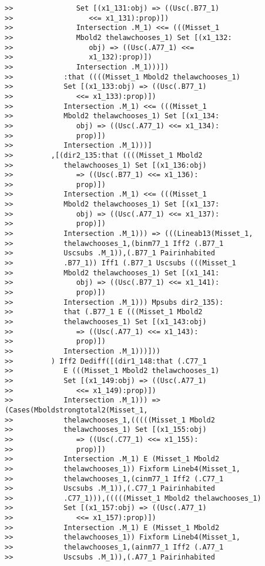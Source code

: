 \documentclass[12pt]{article}
\begin{document}
\begin{verbatim}
>>               Set [(x1_131:obj) => ((Usc(.B77_1)
>>                  <<= x1_131):prop)])
>>               Intersection .M_1) <<= (((Misset_1
>>               Mbold2 thelawchooses_1) Set [(x1_132:
>>                  obj) => ((Usc(.A77_1) <<=
>>                  x1_132):prop)])
>>               Intersection .M_1)))])
>>            :that ((((Misset_1 Mbold2 thelawchooses_1)
>>            Set [(x1_133:obj) => ((Usc(.B77_1)
>>               <<= x1_133):prop)])
>>            Intersection .M_1) <<= (((Misset_1
>>            Mbold2 thelawchooses_1) Set [(x1_134:
>>               obj) => ((Usc(.A77_1) <<= x1_134):
>>               prop)])
>>            Intersection .M_1)))]
>>         ,[(dir2_135:that ((((Misset_1 Mbold2
>>            thelawchooses_1) Set [(x1_136:obj)
>>               => ((Usc(.B77_1) <<= x1_136):
>>               prop)])
>>            Intersection .M_1) <<= (((Misset_1
>>            Mbold2 thelawchooses_1) Set [(x1_137:
>>               obj) => ((Usc(.A77_1) <<= x1_137):
>>               prop)])
>>            Intersection .M_1))) => (((Lineab13(Misset_1,
>>            thelawchooses_1,(binm77_1 Iff2 (.B77_1
>>            Uscsubs .M_1)),(.B77_1 Pairinhabited
>>            .B77_1)) Iff1 (.B77_1 Uscsubs (((Misset_1
>>            Mbold2 thelawchooses_1) Set [(x1_141:
>>               obj) => ((Usc(.B77_1) <<= x1_141):
>>               prop)])
>>            Intersection .M_1))) Mpsubs dir2_135):
>>            that (.B77_1 E (((Misset_1 Mbold2
>>            thelawchooses_1) Set [(x1_143:obj)
>>               => ((Usc(.A77_1) <<= x1_143):
>>               prop)])
>>            Intersection .M_1)))]))
>>         ) Iff2 Dediff([(dir1_148:that (.C77_1
>>            E (((Misset_1 Mbold2 thelawchooses_1)
>>            Set [(x1_149:obj) => ((Usc(.A77_1)
>>               <<= x1_149):prop)])
>>            Intersection .M_1))) => (Cases(Mboldstrongtotal2(Misset_1,
>>            thelawchooses_1,(((((Misset_1 Mbold2
>>            thelawchooses_1) Set [(x1_155:obj)
>>               => ((Usc(.C77_1) <<= x1_155):
>>               prop)])
>>            Intersection .M_1) E (Misset_1 Mbold2
>>            thelawchooses_1)) Fixform Lineb4(Misset_1,
>>            thelawchooses_1,(cinm77_1 Iff2 (.C77_1
>>            Uscsubs .M_1)),(.C77_1 Pairinhabited
>>            .C77_1))),(((((Misset_1 Mbold2 thelawchooses_1)
>>            Set [(x1_157:obj) => ((Usc(.A77_1)
>>               <<= x1_157):prop)])
>>            Intersection .M_1) E (Misset_1 Mbold2
>>            thelawchooses_1)) Fixform Lineb4(Misset_1,
>>            thelawchooses_1,(ainm77_1 Iff2 (.A77_1
>>            Uscsubs .M_1)),(.A77_1 Pairinhabited

\end{verbatim}
\end{document}
